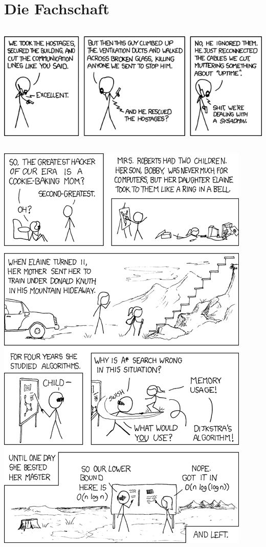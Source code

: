 \documentclass[12pt,a4paper]{scrartcl}
\newcommand*\Newpage{\newpage\null\thispagestyle{empty}\newpage}
\begin{document}
    \section{Die Fachschaft}
    
    \begin{center}
        \includegraphics[height=6cm]{comics/devotion_to_duty.png}
    \end{center}
    \newpage
    \begin{center}
        \includegraphics[height=\textheight]{comics/1337_part_2.png}
    \end{center}

\Newpage %
\end{document}
